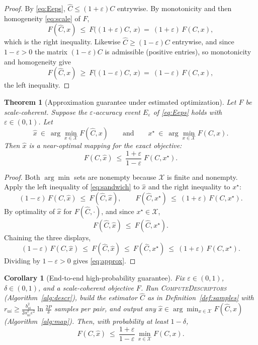 \documentclass{amsart}
\newtheorem{theorem}{Theorem}
\newtheorem{corollary}{Corollary}
\theoremstyle{definition}
\newcommand{\Chat}{\widehat{C}}
\begin{document}
\begin{proof}
By \eqref{eq:Eeps}, $\Chat \le (1+\varepsilon)C$ entrywise. By monotonicity and
then homogeneity \eqref{eq:scale} of $F$,
\[
F(\Chat,x)\ \le\ F\big((1+\varepsilon)C,\,x\big)\ =\ (1+\varepsilon)\,F(C,x),
\]
which is the right inequality. Likewise $\Chat\ge(1-\varepsilon)C$ entrywise, and
since $1-\varepsilon>0$ the matrix $(1-\varepsilon)C$ is admissible
(positive entries), so monotonicity and homogeneity give
\[
F(\Chat,x)\ \ge\ F\big((1-\varepsilon)C,\,x\big)\ =\ (1-\varepsilon)\,F(C,x),
\]
the left inequality.
\end{proof}

\begin{theorem}[Approximation guarantee under estimated optimization]\label{thm:main}
Let $F$ be scale-coherent. Suppose the $\varepsilon$-accuracy event
$E_\varepsilon$ of \eqref{eq:Eeps} holds with $\varepsilon\in(0,1)$. Let
\[
\hat{x}\ \in\ \arg\min_{x\in\mathcal{X}} F(\Chat,x)
\qquad\text{and}\qquad
x^\star\ \in\ \arg\min_{x\in\mathcal{X}} F(C,x).
\]
Then $\hat{x}$ is a near-optimal mapping for the \emph{exact} objective:
\begin{equation}\label{eq:approx}
F(C,\hat{x})\ \le\ \frac{1+\varepsilon}{1-\varepsilon}\;F(C,x^\star).
\end{equation}
\end{theorem}

\begin{proof}
Both $\arg\min$ sets are nonempty because $\mathcal X$ is finite and nonempty.
Apply the left inequality of \eqref{eq:sandwich} to $\hat x$ and the right
inequality to $x^\star$:
\[
(1-\varepsilon)\,F(C,\hat x)\ \le\ F(\Chat,\hat x),
\qquad
F(\Chat,x^\star)\ \le\ (1+\varepsilon)\,F(C,x^\star).
\]
By optimality of $\hat x$ for $F(\Chat,\cdot)$, and since $x^\star\in\mathcal X$,
\[
F(\Chat,\hat x)\ \le\ F(\Chat,x^\star).
\]
Chaining the three displays,
\[
(1-\varepsilon)\,F(C,\hat x)\ \le\ F(\Chat,\hat x)\ \le\ F(\Chat,x^\star)
\ \le\ (1+\varepsilon)\,F(C,x^\star).
\]
Dividing by $1-\varepsilon>0$ gives \eqref{eq:approx}.
\end{proof}

\begin{corollary}[End-to-end high-probability guarantee]\label{cor:e2e}
Fix $\varepsilon\in(0,1)$, $\delta\in(0,1)$, and a scale-coherent objective $F$.
Run \textsc{ComputeDescriptors} (Algorithm~\ref{alg:descr}), build the estimator
$\Chat$ as in Definition~\ref{def:samples} with
$r_{ui}\ge \frac{b_{ui}^2}{2a_{ui}^2\varepsilon^2}\ln\frac{2P}{\delta}$ samples per
pair, and output any
$\hat x\in\arg\min_{x\in\mathcal X}F(\Chat,x)$ (Algorithm~\ref{alg:map}). Then,
with probability at least $1-\delta$,
\[
F(C,\hat x)\ \le\ \frac{1+\varepsilon}{1-\varepsilon}\,\min_{x\in\mathcal X}F(C,x).
\]
\end{corollary}
\end{document}
